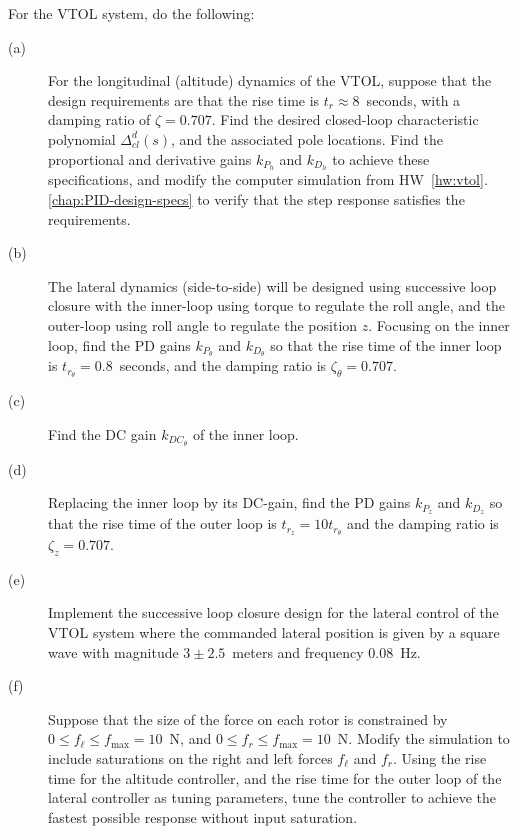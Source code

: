 For the VTOL system, do the following:
\begin{description}
\item[(a)] 
For the longitudinal (altitude) dynamics of the VTOL, suppose that the design requirements are that the rise time is
$t_r \approx 8$~seconds, with a damping ratio of $\zeta=0.707$.  Find the desired closed-loop characteristic polynomial $\Delta_{cl}^d(s)$, and the associated pole locations. Find the proportional and derivative gains $k_{P_h}$ and $k_{D_h}$ to achieve these specifications, and modify the computer simulation from HW~\ref{hw:vtol}.\ref{chap:PID-design-specs} to verify that the step response satisfies the requirements.
\item[(b)] The lateral dynamics (side-to-side) will be designed using successive loop closure with the inner-loop using torque to regulate the roll angle, and the outer-loop using roll angle to regulate the position $z$.  Focusing on the inner loop, find the PD gains $k_{P_\theta}$ and $k_{D_\theta}$ so that the rise time of the inner loop is $t_{r_\theta}=0.8$~seconds, and the damping ratio is $\zeta_{\theta}=0.707$.
\item[(c)] Find the DC gain $k_{DC_\theta}$ of the inner loop.
\item[(d)] Replacing the inner loop by its DC-gain, find the PD gains $k_{P_z}$ and $k_{D_z}$ so that the rise time of the outer loop is $t_{r_z}=10 t_{r_\theta}$ and the damping ratio is $\zeta_z=0.707$.
\item[(e)] Implement the successive loop closure design for the lateral control of the VTOL system where the commanded lateral position is given by a square wave with magnitude $3 \pm 2.5$~meters and frequency $0.08$~Hz.  
\item[(f)] Suppose that the size of the force on each rotor is constrained by $0\leq f_\ell \leq f_{\max}=10$~N, and $0\leq f_r \leq f_{\max}=10$~N.  Modify the simulation to include saturations on the right and left forces $f_\ell$ and $f_r$.  Using the rise time for the altitude controller, and the rise time for the outer loop of the lateral controller as tuning parameters, tune the controller to achieve the fastest possible response without input saturation.
\end{description}
	

